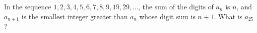 In the sequence $1,2,3,4,5,6,7,8,9,19,29,\dots$, the sum of the digits of $a_n$ is $n$, and $a_{n+1}$ is the smallest integer greater than $a_n$ whose digit sum is $n+1$. What is $a_{25}$?
